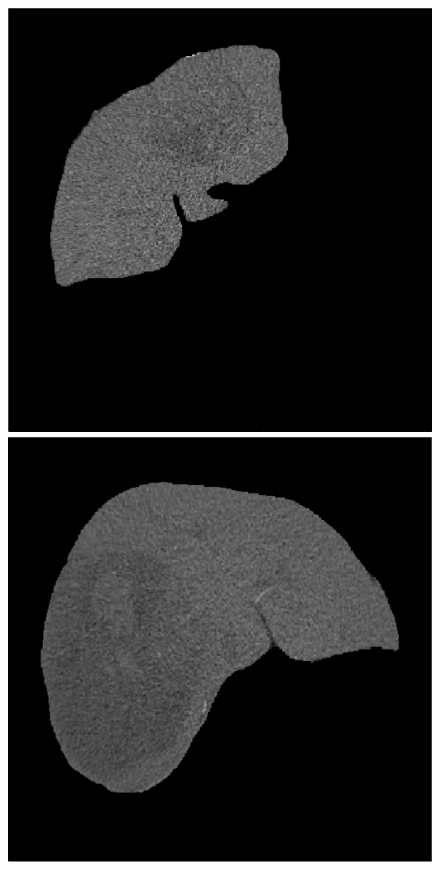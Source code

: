 \begin{figure}[!ht]
\centering
\begin{minipage}{4cm}
\includegraphics[width=\linewidth]{./images/1_21_orig_resized}
\end{minipage} \hspace{-0.3cm}
\begin{minipage}{4cm}
\includegraphics[width=\linewidth]{./images/5_2_orig_resized}

\end{minipage}
\end{figure}
